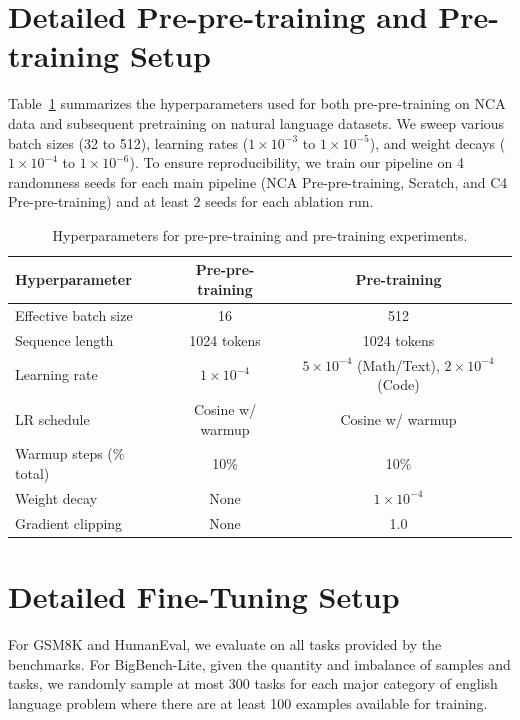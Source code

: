 \section{Detailed Pre-pre-training and Pre-training Setup}
\label{app:experimental-setup}

Table~\ref{tab:hyperparams} summarizes the hyperparameters used for both pre-pre-training on NCA data and subsequent pretraining on natural language datasets. We sweep various batch sizes (32 to 512), learning rates ($1\times10^{-3}$ to $1\times10^{-5}$), and weight decays ($1\times10^{-4}$ to $1\times 10^{-6}$). To ensure reproducibility, we train our pipeline on 4 randomness seeds for each main pipeline (NCA Pre-pre-training, Scratch, and C4 Pre-pre-training) and at least 2 seeds for each ablation run.

\begin{table}[h]
\centering
\small
\setlength{\tabcolsep}{6pt}
\renewcommand{\arraystretch}{1.15}
\begin{tabular}{lcc}
\toprule
\textbf{Hyperparameter} & \textbf{Pre-pre-training} & \textbf{Pre-training} \\
\midrule
Effective batch size & 16 & 512 \\
Sequence length & 1024 tokens & 1024 tokens \\
Learning rate & $1 \times 10^{-4}$ & $5 \times 10^{-4}$ (Math/Text), $2\times 10^{-4}$ (Code) \\
LR schedule & Cosine w/ warmup & Cosine w/ warmup \\
Warmup steps (\% total) & 10\% & 10\% \\
Weight decay & None & $1 \times 10^{-4}$ \\
Gradient clipping & None & 1.0 \\
\bottomrule
\end{tabular}
\caption{Hyperparameters for pre-pre-training and pre-training experiments.}
\label{tab:hyperparams}
\end{table}
\section{Detailed Fine-Tuning Setup}
\label{app:instruction-ft-setup}
For GSM8K and HumanEval, we evaluate on all tasks provided by the benchmarks. For BigBench-Lite, given the quantity and imbalance of samples and tasks, we randomly sample at most 300 tasks for each major category of english language problem where there are at least 100 examples available for training.

